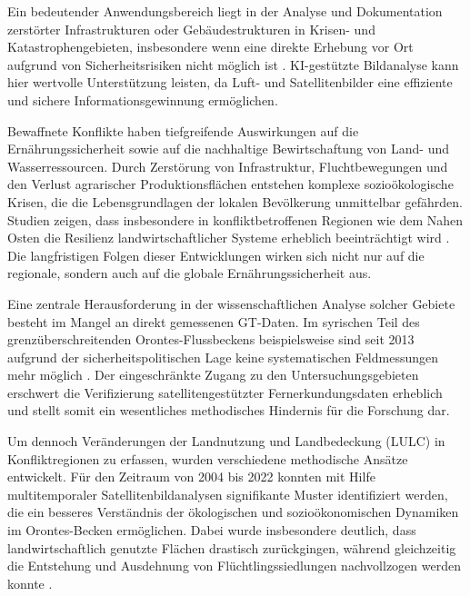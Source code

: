 Ein bedeutender Anwendungsbereich liegt in der Analyse und Dokumentation zerstörter Infrastrukturen oder Gebäudestrukturen in Krisen- und Katastrophengebieten, insbesondere wenn eine direkte Erhebung vor Ort aufgrund von Sicherheitsrisiken nicht möglich ist \cite{Knoth2017}. KI-gestützte Bildanalyse kann hier wertvolle Unterstützung leisten, da Luft- und Satellitenbilder eine effiziente und sichere Informationsgewinnung ermöglichen.

Bewaffnete Konflikte haben tiefgreifende Auswirkungen auf die Ernährungssicherheit sowie auf die nachhaltige Bewirtschaftung von Land- und Wasserressourcen. Durch Zerstörung von Infrastruktur, Fluchtbewegungen und den Verlust agrarischer Produktionsflächen entstehen komplexe sozioökologische Krisen, die die Lebensgrundlagen der lokalen Bevölkerung unmittelbar gefährden. Studien zeigen, dass insbesondere in konfliktbetroffenen Regionen wie dem Nahen Osten die Resilienz landwirtschaftlicher Systeme erheblich beeinträchtigt wird \cite{Mhanna2023}. Die langfristigen Folgen dieser Entwicklungen wirken sich nicht nur auf die regionale, sondern auch auf die globale Ernährungssicherheit aus.

Eine zentrale Herausforderung in der wissenschaftlichen Analyse solcher Gebiete besteht im Mangel an direkt gemessenen \acrfull{GT}-Daten. Im syrischen Teil des grenzüberschreitenden Orontes-Flussbeckens beispielsweise sind seit 2013 aufgrund der sicherheitspolitischen Lage keine systematischen Feldmessungen mehr möglich \cite{Mhanna2023}. Der eingeschränkte Zugang zu den Untersuchungsgebieten erschwert die Verifizierung satellitengestützter Fernerkundungsdaten erheblich und stellt somit ein wesentliches methodisches Hindernis für die Forschung dar.

Um dennoch Veränderungen der Landnutzung und Landbedeckung (\acrfull{LULC}) in Konfliktregionen zu erfassen, wurden verschiedene methodische Ansätze entwickelt. Für den Zeitraum von 2004 bis 2022 konnten mit Hilfe multitemporaler Satellitenbildanalysen signifikante Muster identifiziert werden, die ein besseres Verständnis der ökologischen und sozioökonomischen Dynamiken im Orontes-Becken ermöglichen. Dabei wurde insbesondere deutlich, dass landwirtschaftlich genutzte Flächen drastisch zurückgingen, während gleichzeitig die Entstehung und Ausdehnung von Flüchtlingssiedlungen nachvollzogen werden konnte \cite{Mhanna2023}.

